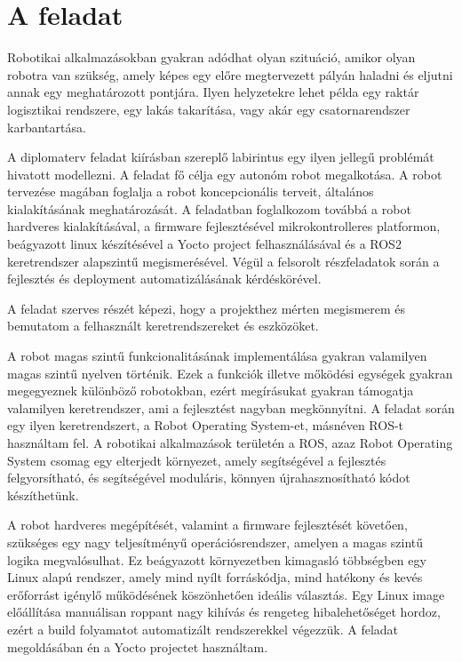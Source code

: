 \section{A feladat}

Robotikai alkalmazásokban gyakran adódhat olyan szituáció, amikor olyan robotra
van szükség, amely képes egy előre megtervezett pályán haladni és eljutni annak
egy meghatározott pontjára. Ilyen helyzetekre lehet példa egy raktár logisztikai
rendszere, egy lakás takarítása, vagy akár egy csatornarendszer karbantartása.

\medskip

A diplomaterv feladat kiírásban szereplő labirintus egy ilyen jellegű problémát
hivatott modellezni. A feladat fő célja egy autonóm robot megalkotása. A robot
tervezése magában foglalja a robot koncepcionális terveit, általános
kialakításának meghatározását. A feladatban foglalkozom továbbá a robot hardveres
kialakításával, a firmware fejlesztésével mikrokontrolleres platformon,
beágyazott linux készítésével a Yocto project felhasználásával és a ROS2
keretrendszer alapszintű megismerésével. Végül a felsorolt részfeladatok során a
fejlesztés és deployment automatizálásának kérdéskörével.

A feladat szerves részét képezi, hogy a projekthez mérten megismerem és bemutatom
a felhasznált keretrendszereket és eszközöket.

A robot magas szintű funkcionalitásának implementálása gyakran valamilyen magas
szintű nyelven történik. Ezek a funkciók illetve mőködési egységek gyakran
megegyeznek különböző robotokban, ezért megírásukat gyakran támogatja valamilyen
keretrendszer, ami a fejlesztést nagyban megkönnyítni. A feladat során egy ilyen
keretrendszert, a Robot Operating System-et, másnéven ROS-t használtam fel. A
robotikai alkalmazások területén a ROS, azaz Robot Operating System csomag egy
elterjedt környezet, amely segítségével a fejlesztés felgyorsítható, és
segítségével moduláris, könnyen újrahasznosítható kódot készíthetünk.

A robot hardveres megépítését, valamint a firmware fejlesztését követően,
szükséges egy nagy teljesítményű operációsrendszer, amelyen a magas szintű logika
megvalósulhat. Ez beágyazott környezetben kimagasló többségben egy Linux alapú
rendszer, amely mind nyílt forráskódja, mind hatékony és kevés erőforrást igénylő
működésének köszönhetően ideális választás. Egy Linux image előállítása
manuálisan roppant nagy kihívás és rengeteg hibalehetőséget hordoz, ezért a build
folyamatot automatizált rendszerekkel végezzük. A feladat megoldásában én a Yocto
projectet használtam.


